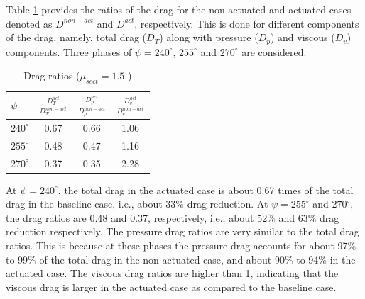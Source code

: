 %




Table \ref{table:D_ratios_mu_1pt5} provides the ratios of the drag for the non-actuated and actuated cases denoted as $D^{non-act}$ and $D^{act}$, respectively.
This is done for different components of the drag, namely, total drag ($D_T$) along with pressure ($D_p$) and viscous ($D_v$) components.
Three phases of $\psi=240^\circ$, $255^\circ$ and $270^\circ$ are considered.


\begin{table}[H]
	\vspace{0cm}
	\centering
	\caption{Drag ratios ($\mu_{sect} = 1.5$ )}
	\label{table:D_ratios_mu_1pt5}
	\begin{tabular}{|l|c|c|c|}
		\hline
		$ \psi$   & {\large $\frac{D^{act}_{T}}{D^{non-act}_{T}}$} & {\large $\frac{D^{act}_{p}}{D^{non-act}_{p}}$} & {\large $\frac{D^{act}_{v}}{D^{non-act}_{v}}$} \\
		\hline
		\hline
		$240^\circ$ & 0.67 & 0.66 & 1.06   \\
		\hline
		$255^\circ$ & 0.48 & 0.47 & 1.16   \\
		\hline
		$270^\circ$ & 0.37 & 0.35 & 2.28   \\
		\hline
	\end{tabular}
\end{table}

At $\psi=240^\circ$, the total drag in the actuated case is about 0.67 times of the total drag in the baseline case, i.e., about 33\% drag reduction. At $\psi=255^\circ$ and $270^\circ$, the drag ratios are 0.48 and 0.37, respectively, i.e., about 52\% and 63\% drag reduction respectively.
The pressure drag ratios are very similar to the total drag ratios.
This is because at these phases the pressure drag accounts for about 97\% to 99\% of the total drag in the non-actuated case, and about 90\% to 94\% in the actuated case.
The viscous drag ratios are higher than 1, indicating that the viscous drag is larger in the actuated case as compared to the baseline case. 




